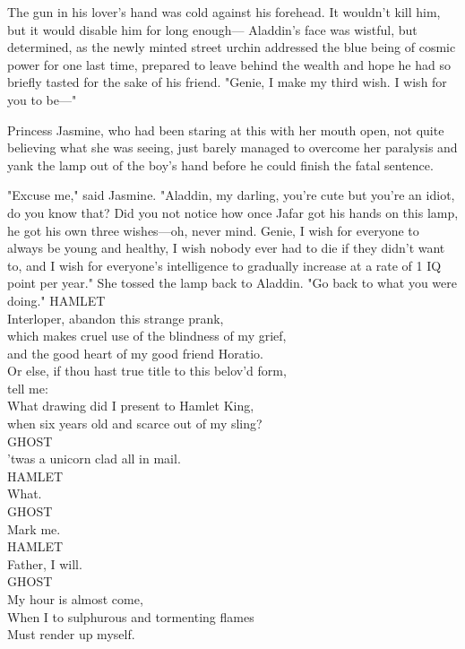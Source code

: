 The gun in his lover's hand was cold against his forehead. It wouldn't kill 
him, but it would disable him for long enough---
\sbreak
Aladdin's face was wistful, but determined, as the newly minted street urchin 
addressed the blue being of cosmic power for one last time, prepared to leave 
behind the wealth and hope he had so briefly tasted for the sake of his friend. 
"Genie, I make my third wish. I wish for you to be---"

Princess Jasmine, who had been staring at this with her mouth open, not quite 
believing what she was seeing, just barely managed to overcome her paralysis 
and yank the lamp out of the boy's hand before he could finish the fatal 
sentence.

"Excuse me," said Jasmine. "Aladdin, my darling, you're cute but you're an 
idiot, do you know that? Did you not notice how once Jafar got his hands on 
this lamp, he got his own three wishes---oh, never mind. Genie, I wish for 
everyone to always be young and healthy, I wish nobody ever had to die if they 
didn't want to, and I wish for everyone's intelligence to gradually increase at 
a rate of 1 IQ point per year." She tossed the lamp back to Aladdin. "Go back 
to what you were doing."
\sbreak
\noindent{}HAMLET\\
Interloper, abandon this strange prank,\\
which makes cruel use of the blindness of my grief,\\
and the good heart of my good friend Horatio.\\
Or else, if thou hast true title to this belov'd form,\\
tell me:\\
What drawing did I present to Hamlet King,\\
when six years old and scarce out of my sling?\\

\noindent{}GHOST\\
'twas a unicorn clad all in mail.\\

\noindent{}HAMLET\\
What.\\

\noindent{}GHOST\\
Mark me.\\

\noindent{}HAMLET\\
Father, I will.\\

\noindent{}GHOST\\
My hour is almost come,\\
When I to sulphurous and tormenting flames\\
Must render up myself.\\

